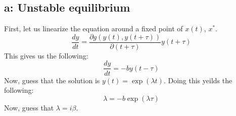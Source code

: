 \documentclass[english]{article}
\begin{document}
\subsection*{a: Unstable equilibrium}
First, let us linearize the equation around a fixed point of $x(t)$, $x^{*}$. 
$$ \frac{dy}{dt} = \frac{\partial g(y(t),y(t+\tau))}{\partial (t+\tau)}y(t+\tau)$$
This gives us the following:
$$ \frac{dy}{dt} = -by(t-\tau)$$
Now, guess that the solution is $y(t)=\exp(\lambda t)$. Doing this yeilds the following:
$$ \lambda = -b\exp(\lambda \tau)$$
Now, guess that $\lambda = i\beta$.
\end{document}
